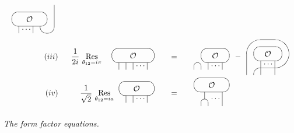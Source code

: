 \documentclass[a4paper,12pt]{article}
\def\limfunc#1{\mathop{\rm #1}}%
\begin{document}
\begin{figure}[tbh]
\[\begin{array}{rrcl}
\begin{array}{c}
\unitlength3.2mm\begin{picture}(6,4) \put(5,1){\oval(2,2)[b]}
\put(2.5,2){\oval(5,2)} \put(2.5,2){\makebox(0,0){${\cal O}$}}
\put(1,0){\line(0,1){1}} \put(3,0){\line(0,1){1}} \put(6,1){\line(0,1){3}}
\put(1.4,.5){$\dots$} \end{picture}
\end{array}
\\ 
(iii) & ~~\dfrac{1}{2i}\,\limfunc{Res}\limits_{\theta _{12}=i\pi }~~ 
\begin{array}{c}
\unitlength3.2mm\begin{picture}(6,4) \put(3,2){\oval(6,2)}
\put(3,2){\makebox(0,0){${\cal O}$}} \put(1,0){\line(0,1){1}}
\put(2,0){\line(0,1){1}} \put(3,0){\line(0,1){1}} \put(5,0){\line(0,1){1}}
\put(3.4,.5){$\dots$} \end{picture}
\end{array}
~~ & = & ~~ 
\begin{array}{c}
\unitlength3.2mm\begin{picture}(5,4) \put(.5,0){\oval(1,2)[t]}
\put(3,2){\oval(4,2)} \put(3,2){\makebox(0,0){${\cal O}$}}
\put(2,0){\line(0,1){1}} \put(4,0){\line(0,1){1}} \put(2.4,.5){$\dots$}
\end{picture}
\end{array}
- 
\begin{array}{c}
\unitlength3.2mm\begin{picture}(6,5.5) \put(0,0){\line(0,1){3}}
\put(3,3){\oval(6,4)[t]} \put(3,3){\oval(6,4)[br]} \put(3,0){\oval(4,2)[tl]}
\put(3,3){\oval(4,2)} \put(3,3){\makebox(0,0){${\cal O}$}}
\put(2,0){\line(0,1){2}} \put(4,0){\line(0,1){2}} \put(2.4,1.5){$\dots$}
\end{picture}
\end{array}
\\ 
(iv) & \dfrac{1}{\sqrt{2}}\,\limfunc{Res}\limits_{\theta _{12}=ia} 
\begin{array}{c}
\unitlength3.2mm\begin{picture}(5,3) \put(2.5,2){\oval(5,2)}
\put(2.5,2){\makebox(0,0){${\cal O}$}} \put(1,0){\line(0,1){1}}
\put(2,0){\line(0,1){1}} \put(4,0){\line(0,1){1}} \put(2.4,.5){$\dots$}
\end{picture}
\end{array}
~~ & = & ~~ 
\begin{array}{c}
\unitlength3.2mm%
\begin{picture}(5,4) \put(2.5,3){\oval(5,2)} \put(2.5,3){\makebox(0,0){${\cal O}$}}
\put(1.5,0){\oval(1,2)[t]}
\put(1.5,1){\line(0,1){1}} \put(4,0){\line(0,1){2}} \put(2.4,1){$\dots$} \end{picture}
\end{array}
\end{array}
\]
\caption{\textit{The form factor equations. }}
\label{f0}
\end{figure}
\end{document}
